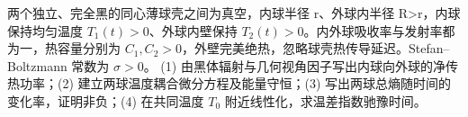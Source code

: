 两个独立、完全黑的同心薄球壳之间为真空，内球半径 r、外球内半径 R>r，内球保持均匀温度 \(T_{1}(t)>0\)、外球内壁保持 \(T_{2}(t)>0\)。内外球吸收率与发射率都为一，热容量分别为 \(C_{1},C_{2}>0\)，外壁完美绝热，忽略球壳热传导延迟。Stefan–Boltzmann 常数为 \(\sigma >0\)。
(1) 由黑体辐射与几何视角因子写出内球向外球的净传热功率；(2) 建立两球温度耦合微分方程及能量守恒；(3) 写出两球总熵随时间的变化率，证明非负；(4) 在共同温度 \(T_{0}\) 附近线性化，求温差指数驰豫时间。
